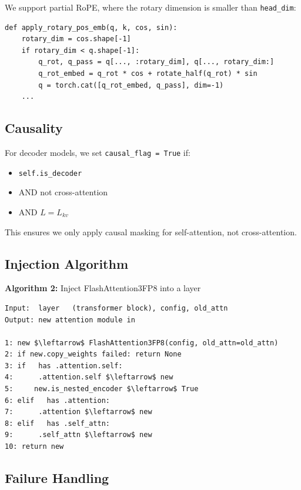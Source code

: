 We support partial RoPE, where the rotary dimension is smaller than 
\texttt{head\_dim}:

\begin{lstlisting}
def apply_rotary_pos_emb(q, k, cos, sin):
    rotary_dim = cos.shape[-1]
    if rotary_dim < q.shape[-1]:
        q_rot, q_pass = q[..., :rotary_dim], q[..., rotary_dim:]
        q_rot_embed = q_rot * cos + rotate_half(q_rot) * sin
        q = torch.cat([q_rot_embed, q_pass], dim=-1)
    ...
\end{lstlisting}

\subsection{Causality}

For decoder models, we set \texttt{causal\_flag = True} if:
\begin{itemize}
\item \texttt{self.is\_decoder}
\item AND not cross-attention
\item AND $L = L_{kv}$

\end{itemize}
This ensures we only apply causal masking for self-attention, not 
cross-attention.

\subsection{Injection Algorithm}

\textbf{Algorithm 2:} Inject FlashAttention3FP8 into a layer
\begin{lstlisting}
Input:  layer   (transformer block), config, old_attn
Output: new attention module in  

1: new $\leftarrow$ FlashAttention3FP8(config, old_attn=old_attn)
2: if new.copy_weights failed: return None
3: if   has .attention.self:
4:      .attention.self $\leftarrow$ new
5:     new.is_nested_encoder $\leftarrow$ True
6: elif   has .attention:
7:      .attention $\leftarrow$ new
8: elif   has .self_attn:
9:      .self_attn $\leftarrow$ new
10: return new
\end{lstlisting}

\subsection{Failure Handling}

